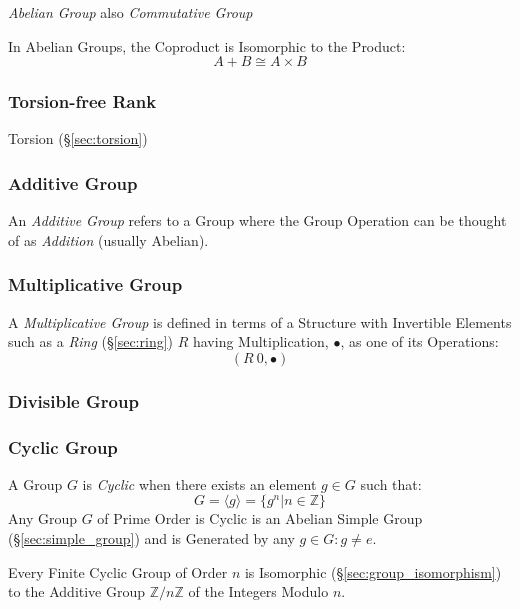 \emph{Abelian Group} also \emph{Commutative Group}

In Abelian Groups, the Coproduct is Isomorphic to the Product:
\[
  A + B \cong A \times B
\]



\subsubsection{Torsion-free Rank}\label{sec:torsionfree_rank}

Torsion (\S\ref{sec:torsion})



\subsubsection{Additive Group}\label{sec:additive_group}

An \emph{Additive Group} refers to a Group where the Group Operation
can be thought of as \emph{Addition} (usually Abelian).



\subsubsection{Multiplicative Group}\label{sec:multiplicative_group}

A \emph{Multiplicative Group} is defined in terms of a Structure with
Invertible Elements such as a \emph{Ring} (\S\ref{sec:ring}) $R$
having Multiplication, $\bullet$, as one of its Operations:
\[
  (R \ {0}, \bullet)
\]



\subsubsection{Divisible Group}\label{sec:divisible_group}

\subsubsection{Cyclic Group}\label{sec:cyclic_group}

A Group $G$ is \emph{Cyclic} when there exists an element $g \in G$
such that:
\[
    G = \langle g \rangle = \{ g^n | n \in \mathbb{Z} \}
\]
Any Group $G$ of Prime Order is Cyclic is an Abelian Simple Group
(\S\ref{sec:simple_group}) and is Generated by any $g \in G : g \neq
e$.

Every Finite Cyclic Group of Order $n$ is Isomorphic
(\S\ref{sec:group_isomorphism}) to the Additive Group
$\mathbb{Z}/n\mathbb{Z}$ of the Integers Modulo $n$.


